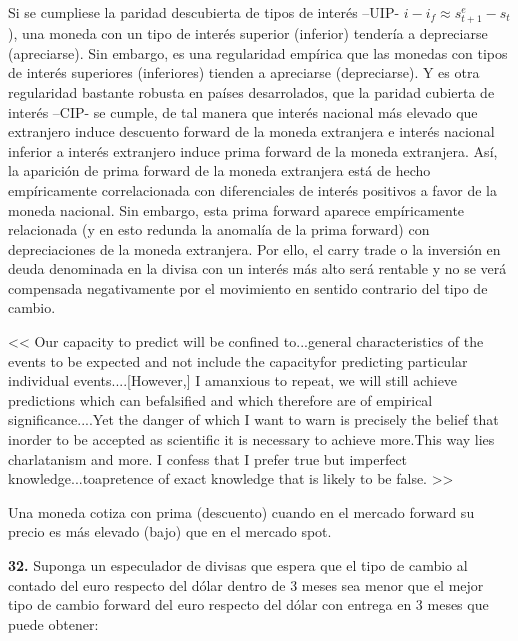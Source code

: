 \documentclass{nuevotema}
\begin{document}
\conceptos


Si se cumpliese la paridad descubierta de tipos de interés --UIP- $i - i_f \approx s^e_{t+1} - s_t$), una moneda con un tipo de interés superior (inferior) tendería a depreciarse (apreciarse). Sin embargo, es una regularidad empírica que las monedas con tipos de interés superiores (inferiores) tienden a apreciarse (depreciarse). Y es otra regularidad bastante robusta en países desarrolados, que la paridad cubierta de interés --CIP- se cumple, de tal manera que interés nacional más elevado que extranjero induce descuento forward de la moneda extranjera e interés nacional inferior a interés extranjero induce prima forward de la moneda extranjera. Así, la aparición de prima forward de la moneda extranjera está de hecho empíricamente correlacionada con diferenciales de interés positivos a favor de la moneda nacional. Sin embargo, esta prima forward aparece empíricamente relacionada (y en esto redunda la anomalía de la prima forward) con depreciaciones de la moneda extranjera. Por ello, el carry trade o la inversión en deuda denominada en la divisa con un interés más alto será rentable y no se verá compensada negativamente por el movimiento en sentido contrario del tipo de cambio.


<< Our capacity to predict will be confined to...general characteristics of the events to be expected and not include the capacityfor predicting particular individual events....[However,] I amanxious to repeat, we will still achieve predictions which can befalsified and which therefore are of empirical significance....Yet the danger of which I want to warn is precisely the belief that inorder to be accepted as scientific it is necessary to achieve more.This way lies charlatanism and more. I confess that I prefer true but imperfect knowledge...toapretence of exact knowledge that is likely to be false. >>


Una moneda cotiza con prima (descuento) cuando en el mercado forward su precio es más elevado (bajo) que en el mercado spot.

\preguntas


\textbf{32.} Suponga un especulador de divisas que espera que el tipo de cambio al contado del euro respecto del dólar dentro de 3 meses sea menor que el mejor tipo de cambio forward del euro respecto del dólar con entrega en 3 meses que puede obtener:
\end{document}
